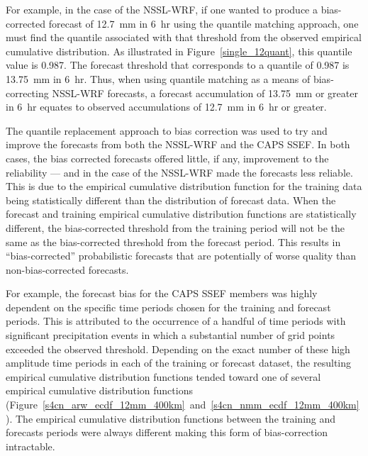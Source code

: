 For example, in the case of the NSSL-WRF, if one wanted to produce a bias-corrected forecast of \mbox{12.7 mm} in \mbox{6 hr} using the quantile matching approach, one must find the quantile associated with that threshold from the observed empirical cumulative distribution.
As illustrated in \mbox{Figure \ref{single_12quant}}, this quantile value is 0.987.
The forecast threshold that corresponds to a quantile of 0.987 is \mbox{13.75 mm} in \mbox{6 hr}.
Thus, when using quantile matching as a means of bias-correcting NSSL-WRF forecasts, a forecast accumulation of \mbox{13.75 mm} or greater in \mbox{6 hr} equates to observed accumulations of \mbox{12.7 mm} in \mbox{6 hr} or greater.


The quantile replacement approach to bias correction was used to try and improve the forecasts from both the NSSL-WRF and the CAPS SSEF.
In both cases, the bias corrected forecasts offered little, if any, improvement to the reliability --- and in the case of the NSSL-WRF made the forecasts less reliable.
This is due to the empirical cumulative distribution function for the training data being statistically different than the distribution of forecast data.
When the forecast and training empirical cumulative distribution functions are statistically different, the bias-corrected threshold from the training period will not be the same as the bias-corrected threshold from the forecast period.
This results in ``bias-corrected'' probabilistic forecasts that are potentially of worse quality than non-bias-corrected forecasts.


For example, the forecast bias for the CAPS SSEF members was highly dependent on the specific time periods chosen for the training and forecast periods.
This is attributed to the occurrence of a handful of time periods with significant precipitation events in which a substantial number of grid points exceeded the observed threshold.
Depending on the exact number of these high amplitude time periods in each of the training or forecast dataset, the resulting empirical cumulative distribution functions tended toward one of several empirical cumulative distribution functions (\mbox{Figure \ref{s4cn_arw_ecdf_12mm_400km} and \ref{s4cn_nmm_ecdf_12mm_400km}}).
The empirical cumulative distribution functions between the training and forecasts periods were always different making this form of bias-correction intractable.


